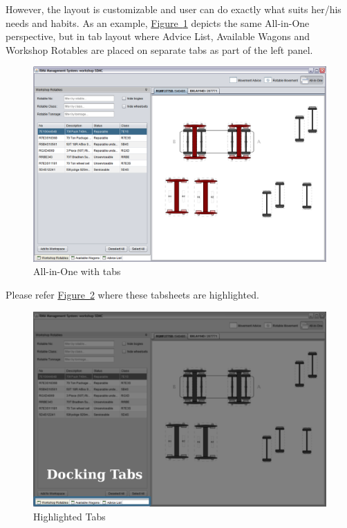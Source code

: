 However, the layout is customizable and user can do exactly what suits her/his needs and habits. As an example, \hyperref[fig:07-all-in-one-with-tabs]{Figure~\ref*{fig:07-all-in-one-with-tabs}} depicts the same All-in-One perspective, but in tab layout where Advice List, Available Wagons and Workshop Rotables are placed on separate tabs as part of the left panel.

\begin{figure}[!h]
\centering
\includegraphics[scale=0.37]{chapters/02-user-interface/images/07-all-in-one-with-tabs.png}
\caption{All-in-One with tabs}\label{fig:07-all-in-one-with-tabs}
\end{figure}

Please refer \hyperref[fig:08-docking-tabsheets]{Figure~\ref*{fig:08-docking-tabsheets}} where these tabsheets are highlighted.

\begin{figure}[!h]
\centering
\includegraphics[scale=0.37]{chapters/02-user-interface/images/08-docking-tabsheets.png}
\caption{Highlighted Tabs}\label{fig:08-docking-tabsheets}
\end{figure}


\clearpage